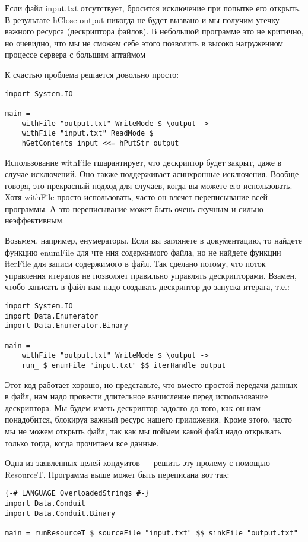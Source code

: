 Если файл input.txt отсутствует, бросится исключение при попытке его открыть. В
результате hClose output никогда не будет вызвано и мы получим утечку важного ресурса
(дескриптора файлов). В небольшой программе это не критично, но очевидно, что мы не
сможем себе этого позволить в высоко нагруженном процессе сервера с большим аптаймом

К счастью проблема решается довольно просто:
\begin{lstlisting}
import System.IO

main =
    withFile "output.txt" WriteMode $ \output ->
    withFile "input.txt" ReadMode $ 
    hGetContents input <<= hPutStr output
\end{lstlisting}

Использование withFile гшарантирует, что дескриптор будет закрыт, даже в случае
исключений. Оно также поддерживает асинхронные исключения. Вообще говоря, это прекрасный
подход для случаев, когда вы можете его использовать. Хотя withFile просто использовать,
часто он влечет переписывание всей программы. А это переписывание может быть очень
скучным и сильно неэффективным.

Возьмем, например, енумераторы. Если вы заглянете в документацию, то найдете функцию
enumFile для чте ния содержимого файла, но не найдете функции iterFile для записи
содержимого в файл. Так сделано потому, что поток управления итератов не позволяет
правильно управлять дескрипторами. Взамен, чтобо записать в файл вам надо создавать
дескриптор до запуска итерата, т.е.: 

\begin{lstlisting}
import System.IO
import Data.Enumerator
import Data.Enumerator.Binary

main =
    withFile "output.txt" WriteMode $ \output ->
    run_ $ enumFile "input.txt" $$ iterHandle output
\end{lstlisting}

Этот код работает хорошо, но представьте, что вместо простой передачи данных в файл, нам
надо провести длительное вычисление перед использование дескриптора. Мы будем иметь
дескриптор задолго до того, как он нам понадобится, блокируя важный ресурс нашего
приложения. Кроме этого, часто мы не можем открыть файл, так как мы поймем какой файл
надо открывать только тогда, когда прочитаем все данные.

Одна из заявленных целей кондуитов --- решить эту пролему с помощью ResourceT. Программа
выше может быть переписана вот так:
\begin{lstlisting}
{-# LANGUAGE OverloadedStrings #-}
import Data.Conduit
import Data.Conduit.Binary

main = runResourceT $ sourceFile "input.txt" $$ sinkFile "output.txt"
\end{lstlisting}

